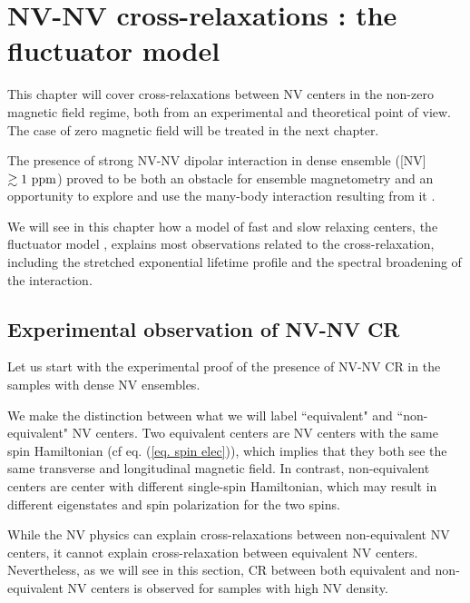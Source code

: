 \documentclass[a4paper, 11pt]{report}
\begin{document}
\chapter{NV-NV cross-relaxations : the fluctuator model}
This chapter will cover cross-relaxations between NV centers in the non-zero magnetic field regime, both from an experimental and theoretical point of view. The case of zero magnetic field will be treated in the next chapter.

The presence of strong NV-NV dipolar interaction in dense ensemble ([NV] $\gtrsim 1\ \rm ppm$) proved to be both an obstacle for ensemble magnetometry \citep{zhou2020quantum} and an opportunity to explore and use the many-body interaction resulting from it \citep{zhou2020quantum, choi2017observation, kucsko2018critical, zu2021emergent}.

We will see in this chapter how a model of fast and slow relaxing centers, the fluctuator model \citep{choi2017depolarization}, explains most observations related to the cross-relaxation, including the stretched exponential lifetime profile and the spectral broadening of the interaction.

\section{Experimental observation of NV-NV CR}
Let us start with the experimental proof of the presence of NV-NV CR in the samples with dense NV ensembles.

We make the distinction between what we will label ``equivalent" and ``non-equivalent" NV centers. Two equivalent centers are NV centers with the same spin Hamiltonian (cf eq. (\ref{eq. spin elec})), which implies that they both see the same transverse and longitudinal magnetic field. In contrast, non-equivalent centers are center with different single-spin Hamiltonian, which may result in different eigenstates and spin polarization for the two spins.

While the NV physics can explain cross-relaxations between non-equivalent NV centers, it cannot explain cross-relaxation between equivalent NV centers. Nevertheless, as we will see in this section, CR between both equivalent and non-equivalent NV centers is observed for samples with high NV density. 
\end{document}
